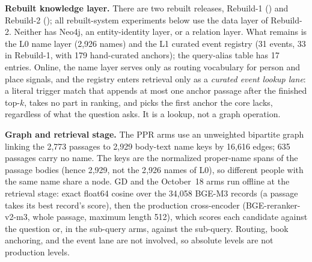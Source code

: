 \textbf{Rebuilt knowledge layer.} There are two rebuilt releases,
Rebuild-1 () and Rebuild-2
(); all rebuilt-system experiments below use
the data layer of Rebuild-2. Neither has Neo4j, an entity-identity layer, or a relation
layer. What remains is the L0 name layer (2{,}926 names) and the L1
curated event registry (31 events, 33 in Rebuild-1, with 179 hand-curated
anchors); the query-alias table has 17 entries. Online, the name layer
serves only as routing vocabulary for person and place signals, and the
registry enters retrieval only as a \emph{curated event lookup lane}: a
literal trigger match that appends
at most one anchor passage after the finished top-$k$, takes no part in
ranking, and picks the first anchor the core lacks, regardless of what
the question asks. It is a lookup, not a graph operation.

\textbf{Graph and retrieval stage.} The PPR arms use an unweighted
bipartite graph linking the 2{,}773 passages to 2{,}929 body-text name
keys by 16{,}616 edges; 635 passages carry no name. The keys are the
normalized proper-name spans of the passage bodies (hence 2{,}929, not
the 2{,}926 names of L0), so different people with the same name share a
node. GD and the October~18 arms run offline at the retrieval stage: exact float64
cosine over the 34{,}058 BGE-M3 records (a passage takes its best
record's score), then the production cross-encoder (BGE-reranker-v2-m3,
whole passage, maximum length 512), which scores each candidate against
the question or, in the sub-query arms, against the sub-query. Routing,
book anchoring, and the event lane are not involved, so absolute levels
are not production levels.

